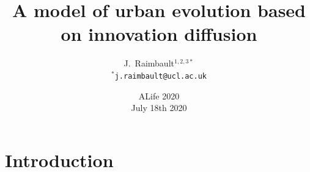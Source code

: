 



\title[A model of urban evolution]{A model of urban evolution based on innovation diffusion}
\author[Raimbault]{J.~Raimbault$^{1,2,3\ast}$\\\medskip
$^{\ast}$\texttt{j.raimbault@ucl.ac.uk}
}



\date[July 18th 2020]{ALife 2020\\
July 18th 2020
}

\frame{\maketitle}







\section{Introduction}


\sframe{}{


}


